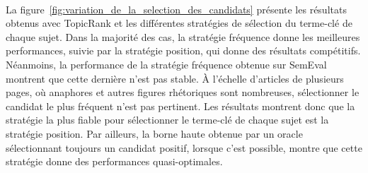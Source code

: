         ~\\La figure~\ref{fig:variation_de_la_selection_des_candidats} présente
        les résultats obtenus avec TopicRank et les différentes stratégies de
        sélection du terme-clé de chaque sujet. Dans la majorité des cas, la
        stratégie fréquence donne les meilleures performances, suivie par la
        stratégie position, qui donne des résultats compétitifs. Néanmoins, la
        performance de la stratégie fréquence obtenue sur SemEval montrent que
        cette dernière n'est pas stable. À l'échelle d'articles de
        plusieurs pages, où anaphores et autres figures
        rhétoriques sont nombreuses, sélectionner le candidat le plus fréquent
        n'est pas pertinent. Les résultats montrent donc que la stratégie la
        plus fiable pour sélectionner le terme-clé de chaque sujet est la
        stratégie position. Par ailleurs, la borne haute obtenue par un oracle
        sélectionnant toujours un candidat positif, lorsque c'est possible, 
        montre que cette stratégie donne des performances quasi-optimales.
